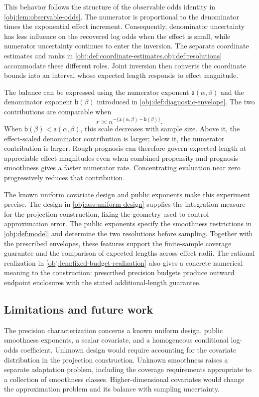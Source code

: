 \documentclass[11pt]{article}
\begin{document}
This behavior follows the structure of the observable odds identity in \cref{obj:lem:observable-odds}. The numerator is proportional to the denominator times the exponential effect increment. Consequently, denominator uncertainty has less influence on the recovered log odds when the effect is small, while numerator uncertainty continues to enter the inversion. The separate coordinate estimates and ranks in \cref{obj:def:coordinate-estimates,obj:def:resolutions} accommodate these different roles. Joint inversion then converts the coordinate bounds into an interval whose expected length responds to effect magnitude.

The balance can be expressed using the numerator exponent \(\mathsf a(\alpha,\beta)\) and the denominator exponent \(\mathsf b(\beta)\) introduced in \cref{obj:def:diagnostic-envelope}. The two contributions are comparable when
\[
r\asymp n^{-\{\mathsf a(\alpha,\beta)-\mathsf b(\beta)\}}.
\]
When \(\mathsf b(\beta)<\mathsf a(\alpha,\beta)\), this scale decreases with sample size. Above it, the effect-scaled denominator contribution is larger; below it, the numerator contribution is larger. Rough prognosis can therefore govern expected length at appreciable effect magnitudes even when combined propensity and prognosis smoothness gives a faster numerator rate. Concentrating evaluation near zero progressively reduces that contribution.

The known uniform covariate design and public exponents make this experiment precise. The design in \cref{obj:ass:uniform-design} supplies the integration measure for the projection construction, fixing the geometry used to control approximation error. The public exponents specify the smoothness restrictions in \cref{obj:def:model} and determine the two resolutions before sampling. Together with the prescribed envelopes, these features support the finite-sample coverage guarantee and the comparison of expected lengths across effect radii. The rational realization in \cref{obj:lem:fixed-budget-realization} also gives a concrete numerical meaning to the construction: prescribed precision budgets produce outward endpoint enclosures with the stated additional-length guarantee.

\subsection{Limitations and future work}

The precision characterization concerns a known uniform design, public smoothness exponents, a scalar covariate, and a homogeneous conditional log-odds coefficient. Unknown design would require accounting for the covariate distribution in the projection construction. Unknown smoothness raises a separate adaptation problem, including the coverage requirements appropriate to a collection of smoothness classes. Higher-dimensional covariates would change the approximation problem and its balance with sampling uncertainty.
\end{document}
